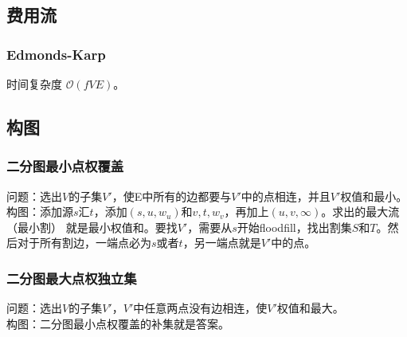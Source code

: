 \subsection{费用流}

\subsubsection{Edmonds-Karp}

时间复杂度 $\mathcal{O}(fVE)$。


\subsection{构图}

\subsubsection{二分图最小点权覆盖}

问题：选出$V$的子集$V'$，使E中所有的边都要与$V'$中的点相连，并且$V'$权值和最小。\\
构图：添加源$s$汇$t$，添加$(s,u,w_u)$和$v,t,w_v$，再加上$(u,v,\infty)$。求出的最大流（最小割）
就是最小权值和。要找$V'$，需要从$s$开始floodfill，找出割集$S$和$T$。然后对于所有割边，一端点必为$s$或者$t$，另一端点就是$V'$中的点。

\subsubsection{二分图最大点权独立集}

问题：选出$V$的子集$V'$，$V'$中任意两点没有边相连，使$V'$权值和最大。\\
构图：二分图最小点权覆盖的补集就是答案。
